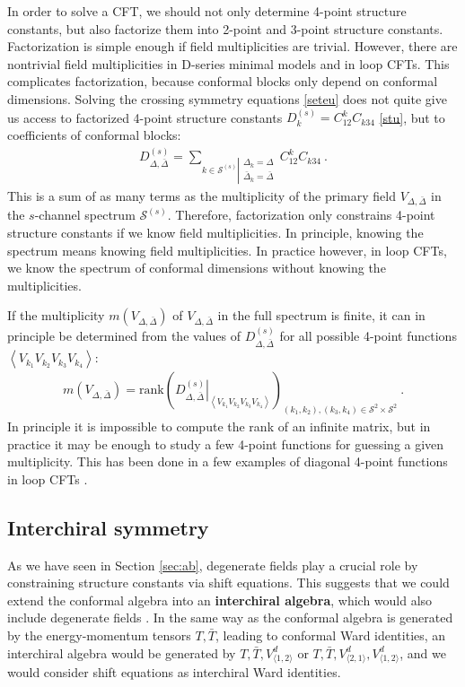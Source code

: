\documentclass[12pt, a4paper]{article}
\newcommand{\myindex}[1]{\textbf{\boldmath #1}}
\theoremstyle{break}
\begin{document}
In order to solve a CFT, we should not only determine 4-point structure constants, but also factorize them into 2-point and 3-point structure constants. Factorization is simple enough if field multiplicities are trivial. However, there are nontrivial field multiplicities in D-series minimal models and in loop CFTs. 
This complicates factorization, because conformal blocks only depend on conformal dimensions. Solving the crossing symmetry equations \eqref{seteu} does not quite give us access to factorized 4-point structure constants $D^{(s)}_k = C^k_{12}C_{k34}$ \eqref{stu}, but to coefficients of conformal blocks:
\begin{align}
 D^{(s)}_{\Delta,\bar\Delta} = \sum_{k\in\mathcal{S}^{(s)}\left|\substack{\Delta_k=\Delta\\ \bar{\Delta}_k=\bar\Delta}\right.} C^k_{12}C_{k34} \ .
 \label{dcc}
\end{align}
This is a sum of as many terms as the multiplicity of the primary field $V_{\Delta,\bar\Delta}$ in the $s$-channel spectrum $\mathcal{S}^{(s)}$. Therefore, factorization only constrains 4-point structure constants if we know field multiplicities. In principle, knowing the spectrum means knowing field multiplicities. In practice however, in loop CFTs, we know the spectrum of conformal dimensions without knowing the multiplicities. 

If the multiplicity $m(V_{\Delta,\bar\Delta})$ of $V_{\Delta,\bar\Delta}$ in the full spectrum is finite, it can in principle be determined from the values of $D^{(s)}_{\Delta,\bar\Delta}$ for all possible 4-point functions $\left<V_{k_1}V_{k_2}V_{k_3}V_{k_4}\right>$: 
\begin{align}
 m\left(V_{\Delta,\bar\Delta}\right) = \text{rank}\left(\left.D^{(s)}_{\Delta,\bar\Delta}\right|_{\left<V_{k_1}V_{k_2}V_{k_3}V_{k_4}\right>}\right)_{(k_1,k_2),(k_3,k_4)\in\mathcal{S}^2\times \mathcal{S}^2}\ .
\end{align}
In principle it is impossible to compute the rank of an infinite matrix, but 
in practice it may be enough to study a few 4-point functions for guessing a given multiplicity. This has been done in a few examples of diagonal 4-point functions in loop CFTs \cite{rib22}.

\subsection{Interchiral symmetry} \label{sec:icb}

As we have seen in Section \ref{sec:ab}, degenerate fields play a crucial role by constraining structure constants via shift equations. This suggests that we could extend the conformal algebra into an  \myindex{interchiral algebra}, which would also include degenerate fields \cite{grs12}. In the same way as the conformal algebra is generated by the energy-momentum tensors $T,\bar T$, leading to conformal Ward identities, an interchiral algebra would be generated by $T,\bar T,V^d_{\langle 1,2\rangle}$ or $T,\bar T,V^d_{\langle 2,1\rangle},V^d_{\langle 1,2\rangle}$, and we would consider shift equations as interchiral Ward identities. 
\end{document}

